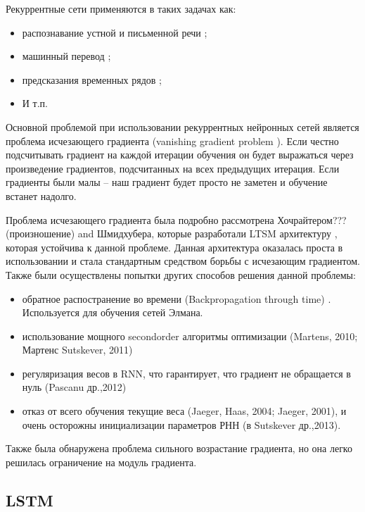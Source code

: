 Рекуррентные сети применяются в таких задачах как:
\begin{itemize}
	\item распознавание устной и письменной речи \cite{rnn_for_speech_recognition, rnn_for_text_recognition};
	\item машинный перевод \cite{rnn_for_translation};
	\item предсказания временных рядов \cite{rnn_for_prediction};
	\item И т.п.
\end{itemize}



Основной проблемой при использовании рекуррентных нейронных сетей является проблема исчезающего градиента (vanishing gradient problem \cite{vanishing_gradient_problem}). Если честно подсчитывать градиент на каждой итерации обучения он будет выражаться через произведение градиентов, подсчитанных на всех предыдущих итерация. Если градиенты были малы – наш градиент будет просто не заметен и обучение встанет надолго. 

Проблема исчезающего градиента была подробно рассмотрена Хочрайтером???(произношение) and Шмидхубера, которые разработали LTSM архитектуру \cite{create_lstm}, которая устойчива к данной проблеме. Данная архитектура оказалась проста в использовании и стала стандартным средством борьбы с исчезающим градиентом. Также были осуществлены попытки других способов решения данной проблемы:
\begin{itemize}
	\item обратное распостранение во времени (Backpropagation through time) \cite{Backpropagation}. Используется для обучения сетей Элмана.
	\item использование мощного secondorder алгоритмы оптимизации (Martens, 2010; Мартенс Sutskever, 2011)
	\item регуляризация весов в RNN, что гарантирует, что градиент не обращается в нуль (Pascanu др.,2012)
	\item отказ от всего обучения текущие веса (Jaeger, Haas, 2004; Jaeger, 2001), и очень
	осторожны инициализации параметров РНН (в Sutskever др.,2013).
\end{itemize}
	
Также была обнаружена проблема сильного возрастание градиента, но она легко решилась ограничение на модуль градиента.

\subsection{LSTM}


